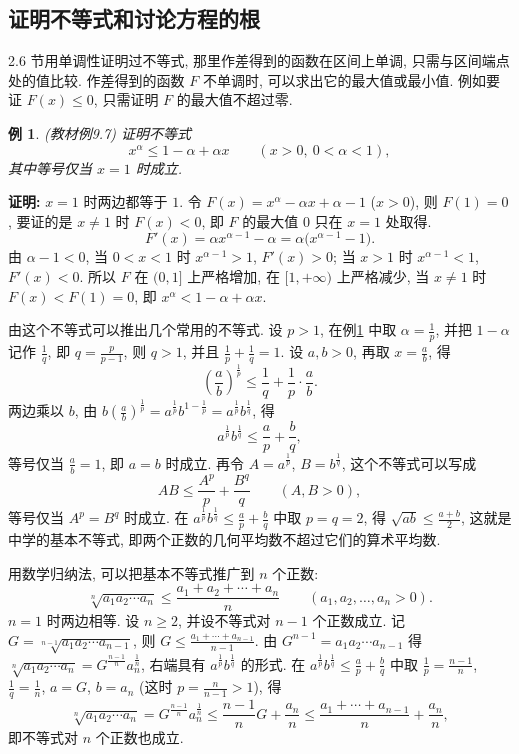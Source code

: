 \documentclass[UTF8,openany]{ctexbook}
\theoremstyle{chinesetextbook}
\newtheorem{example}{例}[section]
\newenvironment{cnproof}{\par\indent\textbf{证明:} \ignorespaces}{\par}
\begin{document}
\subsection{证明不等式和讨论方程的根}
2.6 节用单调性证明过不等式, 那里作差得到的函数在区间上单调, 只需与区间端点处的值比较. 作差得到的函数 $F$ 不单调时, 可以求出它的最大值或最小值. 例如要证 $F(x)\le0$, 只需证明 $F$ 的最大值不超过零.
\begin{example}\label{ex:c2-9-7}
\textnormal{(教材例9.7)} 证明不等式
\[
x^\alpha\le1-\alpha+\alpha x\qquad(x>0,\ 0<\alpha<1),
\]
其中等号仅当 $x=1$ 时成立.
\end{example}
\begin{cnproof}
$x=1$ 时两边都等于 $1$. 令 $F(x)=x^\alpha-\alpha x+\alpha-1$ ($x>0$), 则 $F(1)=0$, 要证的是 $x\ne1$ 时 $F(x)<0$, 即 $F$ 的最大值 $0$ 只在 $x=1$ 处取得.
\[
F'(x)=\alpha x^{\alpha-1}-\alpha=\alpha\bigl(x^{\alpha-1}-1\bigr).
\]
由 $\alpha-1<0$, 当 $0<x<1$ 时 $x^{\alpha-1}>1$, $F'(x)>0$; 当 $x>1$ 时 $x^{\alpha-1}<1$, $F'(x)<0$. 所以 $F$ 在 $(0,1]$ 上严格增加, 在 $[1,+\infty)$ 上严格减少, 当 $x\ne1$ 时 $F(x)<F(1)=0$, 即 $x^\alpha<1-\alpha+\alpha x$.
\end{cnproof}
由这个不等式可以推出几个常用的不等式. 设 $p>1$, 在例\ref{ex:c2-9-7} 中取 $\displaystyle\alpha=\frac1p$, 并把 $1-\alpha$ 记作 $\displaystyle\frac1q$, 即 $\displaystyle q=\frac p{p-1}$, 则 $q>1$, 并且 $\displaystyle\frac1p+\frac1q=1$. 设 $a,b>0$, 再取 $\displaystyle x=\frac ab$, 得
\[
\left(\frac ab\right)^{\frac1p}\le\frac1q+\frac1p\cdot\frac ab.
\]
两边乘以 $b$, 由 $\displaystyle b\left(\frac ab\right)^{\frac1p}=a^{\frac1p}b^{1-\frac1p}=a^{\frac1p}b^{\frac1q}$, 得
\[
a^{\frac1p}b^{\frac1q}\le\frac ap+\frac bq,
\]
等号仅当 $\displaystyle\frac ab=1$, 即 $a=b$ 时成立. 再令 $A=a^{\frac1p}$, $B=b^{\frac1q}$, 这个不等式可以写成
\[
AB\le\frac{A^p}p+\frac{B^q}q\qquad(A,B>0),
\]
等号仅当 $A^p=B^q$ 时成立. 在 $\displaystyle a^{\frac1p}b^{\frac1q}\le\frac ap+\frac bq$ 中取 $p=q=2$, 得 $\displaystyle\sqrt{ab}\le\frac{a+b}2$, 这就是中学的基本不等式, 即两个正数的几何平均数不超过它们的算术平均数.

用数学归纳法, 可以把基本不等式推广到 $n$ 个正数:
\[
\sqrt[n]{a_1a_2\cdots a_n}\le\frac{a_1+a_2+\cdots+a_n}n\qquad(a_1,a_2,\ldots,a_n>0).
\]
$n=1$ 时两边相等. 设 $n\ge2$, 并设不等式对 $n-1$ 个正数成立. 记 $G=\sqrt[n-1]{a_1a_2\cdots a_{n-1}}$, 则 $\displaystyle G\le\frac{a_1+\cdots+a_{n-1}}{n-1}$. 由 $G^{n-1}=a_1a_2\cdots a_{n-1}$ 得 $\sqrt[n]{a_1a_2\cdots a_n}=G^{\frac{n-1}n}a_n^{\frac1n}$, 右端具有 $a^{\frac1p}b^{\frac1q}$ 的形式. 在 $\displaystyle a^{\frac1p}b^{\frac1q}\le\frac ap+\frac bq$ 中取 $\displaystyle\frac1p=\frac{n-1}n$, $\displaystyle\frac1q=\frac1n$, $a=G$, $b=a_n$ (这时 $\displaystyle p=\frac n{n-1}>1$), 得
\[
\sqrt[n]{a_1a_2\cdots a_n}=G^{\frac{n-1}n}a_n^{\frac1n}\le\frac{n-1}nG+\frac{a_n}n\le\frac{a_1+\cdots+a_{n-1}}n+\frac{a_n}n,
\]
即不等式对 $n$ 个正数也成立.
\end{document}
